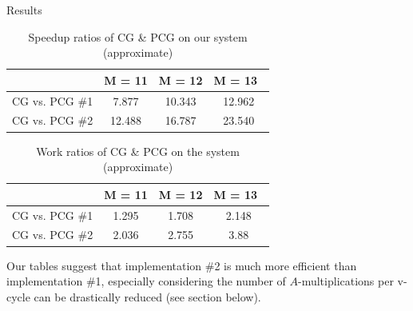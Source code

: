 \documentclass[10pt]{article}
\theoremstyle{definition}
\begin{document}
\begin{section}{Results}
\begin{table}[h]\Large
\begin{center}
\begin{tabular}{lc|c|c}
			            &  M = 11 & M = 12 & M = 13\ \\ \hline
CG vs. PCG \#1        	& 7.877 & 10.343 & 12.962  \\
CG vs. PCG \#2          & 12.488 & 16.787 & 23.540  \\
\end{tabular}
\caption{Speedup ratios of CG \& PCG on our system (approximate)}
\end{center}
\end{table}

\begin{table}[h]\Large
\begin{center}
\begin{tabular}{lc|c|c}
	            &  M = 11 & M = 12 & M = 13\ \\ \hline
CG vs. PCG \#1         	& 1.295 & 1.708 & 2.148  \\
CG vs. PCG \#2         & 2.036 & 2.755 & 3.88  \\
\end{tabular}
\caption{Work ratios of CG \& PCG on the system (approximate)}
\end{center}
\end{table}

Our tables suggest that implementation \#2 is much more efficient than implementation \#1, especially considering the number of $A$-multiplications per v-cycle can be drastically reduced (see section below).
\end{section}
\end{document}
